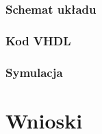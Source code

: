 \documentclass[a4paper,12pt]{extarticle}  %
\begin{document}
    \subsubsection{Schemat układu}
    \begin{figure}[H]
        \centering
    \end{figure}
    \subsubsection{Kod VHDL}
    
    \subsubsection{Symulacja}
    \begin{figure}[H]
        \centering
    \end{figure}
\section{Wnioski}
\end{document}
